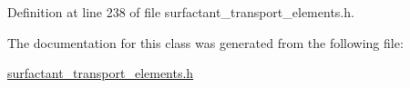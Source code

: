Definition at line 238 of file surfactant\+\_\+transport\+\_\+elements.\+h.



The documentation for this class was generated from the following file\+:\begin{DoxyCompactItemize}
\item 
\hyperlink{surfactant__transport__elements_8h}{surfactant\+\_\+transport\+\_\+elements.\+h}\end{DoxyCompactItemize}

